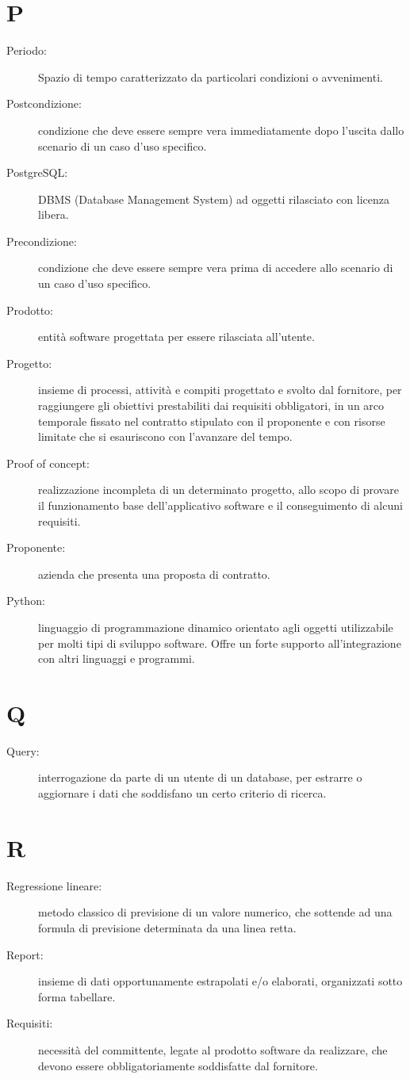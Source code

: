 \documentclass{article}
\begin{document}
	\section{P}
	\begin{description}
		\item[Periodo:] Spazio di tempo caratterizzato da particolari condizioni o avvenimenti.
		\item[Postcondizione:] condizione che deve essere sempre vera immediatamente dopo l'uscita dallo scenario di un caso d'uso specifico.
		\item[PostgreSQL:] DBMS (Database Management System) ad oggetti rilasciato con licenza libera.
		\item[Precondizione:] condizione che deve essere sempre vera prima di accedere allo scenario di un caso d'uso specifico.
		\item[Prodotto:] entità software progettata per essere rilasciata all'utente.
		\item[Progetto:] insieme di processi, attività e compiti progettato e svolto dal fornitore, per raggiungere gli obiettivi prestabiliti dai requisiti obbligatori, in un arco temporale fissato nel contratto stipulato con il proponente e con risorse limitate che si esauriscono con l'avanzare del tempo.
		\item[Proof of concept:] realizzazione incompleta di un determinato progetto, allo scopo di provare il funzionamento base dell'applicativo software e il conseguimento di alcuni requisiti.
		\item[Proponente:] azienda che presenta una proposta di contratto.
		\item[Python:] linguaggio di programmazione dinamico orientato agli oggetti utilizzabile per molti tipi di sviluppo software. Offre un forte supporto all'integrazione con altri linguaggi e programmi.
	\end{description}
	\newpage
	\section{Q}
	\begin{description}
		\item[Query:] interrogazione da parte di un utente di un database, per estrarre o aggiornare i dati che soddisfano un certo criterio di ricerca.
	\end{description}
	\newpage
	\section{R}
  \begin{description}
    \item[Regressione lineare:] metodo classico di previsione di un valore numerico, che sottende ad una formula di previsione determinata da una linea retta.
		\item[Report:] insieme di dati opportunamente estrapolati e/o elaborati, organizzati sotto forma tabellare.
		\item[Requisiti:] necessità del committente, legate al prodotto software da realizzare, che devono essere obbligatoriamente soddisfatte dal fornitore.
	\end{description}
	\newpage
\end{document}
